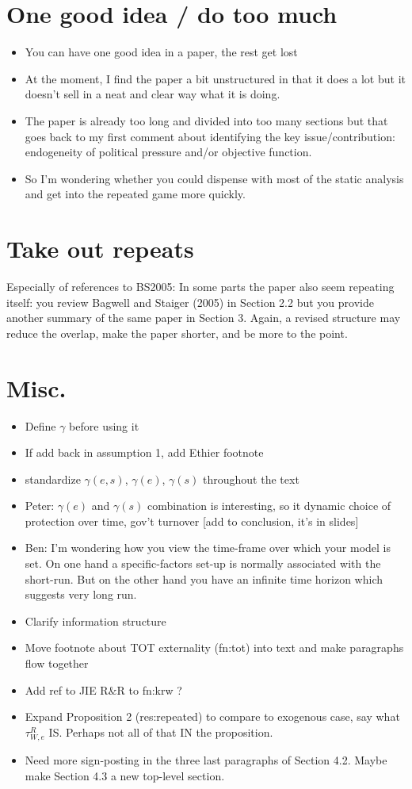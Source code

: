 \documentclass[12pt]{article}
\newcommand{\ga}{\gamma}
\begin{document}
\section{One good idea / do too much}
		\begin{itemize}
			\item You can have one good idea in a paper, the rest get lost
			\item At the moment, I find the paper a bit unstructured in that it does a lot but it doesn't sell in a neat and clear way what it is doing.
			\item The paper is already too long and divided into too many sections but that goes back to my first comment about identifying the key issue/contribution: endogeneity of political pressure and/or objective function.
			\item So I'm wondering whether you could dispense with most of the static analysis and get into the repeated game more quickly.
		\end{itemize}


\section{Take out repeats}
	Especially of references to BS2005: In some parts the paper also seem repeating itself: you review Bagwell and Staiger (2005) in Section 2.2 but you provide another summary of the same paper in Section 3. Again, a revised structure may reduce the overlap, make the paper shorter, and be more to the point.
	

\section{Misc.}
\begin{itemize}
	\item Define $\ga$ before using it
	\item If add back in assumption 1, add Ethier footnote
	\item standardize $\ga(e,s)$, $\ga(e)$, $\ga(s)$ throughout the text
	\item Peter: $\ga(e)$ and $\ga(s)$ combination is interesting, so it dynamic choice of protection over time, gov't turnover [add to conclusion, it's in slides]
	\item Ben: I'm wondering how you view the time-frame over which your model is set.  On one hand a specific-factors set-up is normally associated with the short-run.  But on the other hand you have an infinite time horizon which suggests very long run.
	\item Clarify information structure
	\item Move footnote about TOT externality (fn:tot) into text and make paragraphs flow together
	\item Add ref to JIE R$\&$R to fn:krw ?
	\item Expand Proposition 2 (res:repeated) to compare to exogenous case, say what $\tau^R_{W,e}$ IS. Perhaps not all of that IN the proposition.
	\item Need more sign-posting in the three last paragraphs of Section 4.2. Maybe make Section 4.3 a new top-level section.
\end{itemize}
\end{document}
